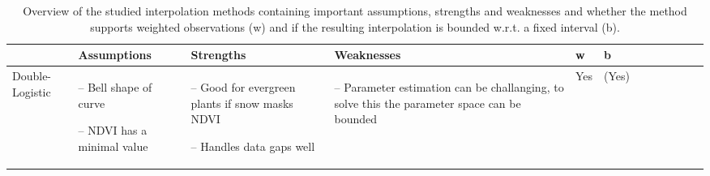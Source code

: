 \begin{table}[!ht]
	\centering
	\caption[Overview of the studied interpolation methods.]{Overview of the studied interpolation methods containing important assumptions, strengths and weaknesses and whether the method supports weighted observations (w) and if the resulting interpolation is bounded w.r.t. a fixed interval (b).}
	\small
	\begin{tabular}{p{1.6cm}p{3.3cm}p{3.3cm}p{3.4cm}p{0.4cm}p{0.4cm}p{3cm}p{3cm}p{3cm}p{3cm}p{2.7cm}p{3cm}|}
		\toprule
		~                                                                                                                                                            &
		\textbf{Assumptions}                                                                                                                                         &
		\textbf{Strengths}                                                                                                                                                &
		\textbf{Weaknesses}                                                                                                                                                &
		\textbf{w}                                                                                                                                      &
		\textbf{b}                                                                                                                                        \\ \hline

		Double-Logistic                                                                                                                                              &
		\begin{cptitemize} \item[--]  Bell shape of curve \item[--]  NDVI has a minimal value                       \end{cptitemize}        &
		\begin{cptitemize} \item[--]  Good for evergreen plants if snow masks NDVI \item[--] Handles data gaps well                            \end{cptitemize}        &
		\begin{cptitemize} \item[--]  Parameter estimation can be challanging, to solve this the parameter space can be bounded             \end{cptitemize}        &
		Yes                                                                                                                                                          &
		(Yes)                                                                                                                                                         \\ \hline%


\end{tabular}
\end{table}
